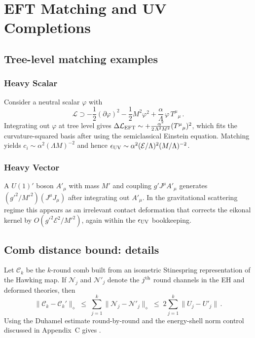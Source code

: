 \documentclass[11pt,a4paper]{article}
\theoremstyle{plain}
\theoremstyle{definition}
\theoremstyle{remark}
\begin{document}
\label{app:gw-sim} %

\section{EFT Matching and UV Completions}
\label{app:new-physics-eft}

\subsection{Tree-level matching examples}
\subsubsection{Heavy Scalar}
Consider a neutral scalar $\varphi$ with
\begin{equation}
\mathcal{L}\supset -\frac{1}{2}(\partial\varphi)^2-\frac{1}{2}M^2\varphi^2+\frac{\alpha}{\Lambda}\,\varphi\,T^\mu{}_\mu\,.
\end{equation}
Integrating out $\varphi$ at tree level gives $\Delta\mathcal{L}_{\rm EFT}\sim +\frac{\alpha^2}{2\,\Lambda^2 M^2}(T^\mu{}_\mu)^2$, which fits the curvature-squared basis after using the semiclassical Einstein equation. Matching yields $c_i\sim \alpha^2(\Lambda M)^{-2}$ and hence $\epsilon_{\rm UV}\sim \alpha^2(\mathcal{E}/\Lambda)^2(M/\Lambda)^{-2}$.

\subsubsection{Heavy Vector}
A $U(1)'$ boson $A'_\mu$ with mass $M'$ and coupling $g' J^\mu A'_\mu$ generates $(g'^2/M'^2)(J^\mu J_\mu)$ after integrating out $A'_\mu$. In the gravitational scattering regime this appears as an irrelevant contact deformation that corrects the eikonal kernel by $O(g'^2 \mathcal{E}^2/M'^2)$, again within the $\epsilon_{\rm UV}$ bookkeeping.

\subsection{Comb distance bound: details}
Let $\mathcal{C}_k$ be the $k$-round comb built from an isometric Stinespring representation of the Hawking map. If $\mathcal{N}_j$ and $\mathcal{N}'_j$ denote the $j^{\rm th}$ round channels in the EH and deformed theories, then
\begin{equation}
\big\|\mathcal{C}_k-\mathcal{C}_k'\big\|_\diamond \;\le\; \sum_{j=1}^k \big\|\mathcal{N}_j-\mathcal{N}'_j\big\|_\diamond \;\le\; 2\sum_{j=1}^k \big\|U_j-U'_j\big\|\,.
\end{equation}
Using the Duhamel estimate round-by-round and the energy-shell norm control discussed in Appendix~C gives .
\end{document}
